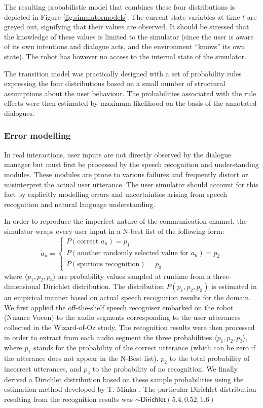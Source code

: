 The resulting probabilistic model that combines these four distributions is depicted in Figure \ref{fig:simulatormodels}. The current state variables at time $t$ are greyed out, signifying that their values are observed.  It should be stressed that the knowledge of these values is limited to the simulator (since the user is aware of its own intentions and dialogue acts, and the environment ``knows'' its own state). The robot has however no access to the internal state of the simulator. 

The transition model was practically designed with a set of probability rules expressing the four distributions based on a small number of structural assumptions about the user behaviour.  The probabilities associated with the rule effects were then estimated by maximum likelihood on the basis of the annotated dialogues. 

\subsubsection*{Error modelling}

In real interactions, user inputs are not directly observed by the dialogue manager but must first be processed by the speech recognition and understanding modules.  These modules are prone to various failures and frequently distort or misinterpret the actual user utterance. The user simulator should account for this fact by explicitly modelling errors and uncertainties arising from speech recognition and natural language understanding. 

In order to reproduce the imperfect nature of the communication channel, the simulator wraps every user input in a N-best list of the following form: 
\begin{equation}
\tilde{a}_u = \begin{cases} P(\text{correct } a_u) = p_1 \\ P(\text{another randomly selected value for } a_u) = p_2 \\ P(\text{spurious recognition}) = p_3 \end{cases} \nonumber
\end{equation}
where $\langle p_1, p_2, p_3 \rangle$ are probability values sampled at runtime from a three-dimensional Dirichlet distribution.  The distribution $P(p_1, p_2, p_3)$ is estimated in an empirical manner based on actual speech recognition results for the domain. We first applied the off-the-shelf speech recogniser embarked on the robot (Nuance Vocon) to the audio segments corresponding to the user utterances collected in the Wizard-of-Oz study.  The recognition results were then processed in order to extract from each audio segment the three probabilities $\langle p_1, p_2, p_3 \rangle$, where $p_1$ stands for the probability of the correct utterance (which can be zero if the utterance does not appear in the N-Best list), $p_2$ to the total probability of incorrect utterances, and $p_3$ to the probability of no recognition. We finally derived a Dirichlet distribution based on these sample probabilities using the estimation method developed by T. Minka \citep{minka2003}.  The particular Dirichlet distribution resulting from the recognition results was $\sim\mathsf{Dirichlet}(5.4, 0.52, 1.6)$

